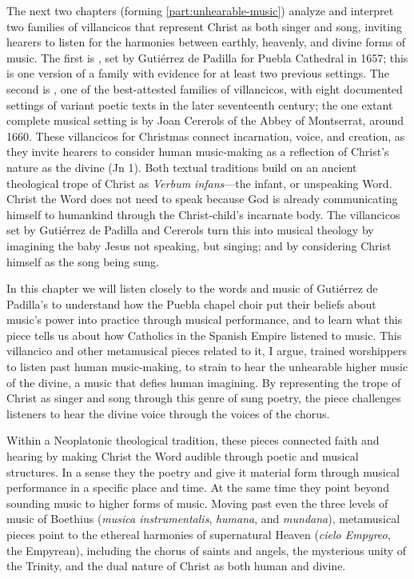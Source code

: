 The next two chapters (forming \cref{part:unhearable-music}) analyze and
interpret two families of villancicos that represent Christ as both singer and
song, inviting hearers to listen for the harmonies between earthly, heavenly,
and divine forms of music.
The first is , set by Gutiérrez de Padilla
for Puebla Cathedral in 1657; this is one version of a family with evidence for
at least two previous settings.
The second is , one of the
best-attested families of villancicos, with eight documented settings of variant
poetic texts in the later seventeenth century; the one extant complete musical
setting is by Joan Cererols of the Abbey of Montserrat, around 1660.
These villancicos for Christmas connect incarnation, voice, and creation, as
they invite hearers to consider human music-making as a reflection of
Christ's nature as the divine  (Jn 1).
Both textual traditions build on an ancient theological trope of Christ as
\emph{Verbum infans}---the infant, or unspeaking Word.
Christ the Word does not need to speak because God is already communicating
himself to humankind through the Christ-child's incarnate body.
The villancicos set by Gutiérrez de Padilla and Cererols turn this into musical
theology by imagining the baby Jesus not speaking, but singing; and by
considering Christ himself as the song being sung.

In this chapter we will listen closely to the words and music of Gutiérrez de
Padilla's  to understand how the Puebla chapel
choir put their beliefs about music's power into practice through musical
performance, and to learn what this piece tells us about how Catholics in the
Spanish Empire listened to music.
This villancico and other metamusical pieces related to it, I argue, trained
worshippers to listen past human music-making, to strain to hear the unhearable
higher music of the divine, a music that defies human imagining.
By representing the trope of Christ as singer and song through this genre of
sung poetry, the piece challenges listeners to hear the divine voice through the
voices of the chorus.

Within a Neoplatonic theological tradition, these pieces connected faith and
hearing by making Christ the Word audible through poetic and musical structures.
In a sense they  the poetry and give it material form through
musical performance in a specific place and time.
At the same time they point beyond sounding music to higher forms of music.
Moving past even the three levels of music of Boethius (\emph{musica
instrumentalis}, \emph{humana}, and \emph{mundana}), metamusical pieces point to
the ethereal harmonies of supernatural Heaven (\emph{cielo Empyreo}, the
Empyrean), including the chorus of saints and angels, the mysterious unity of
the Trinity, and the dual nature of Christ as both human and divine.

